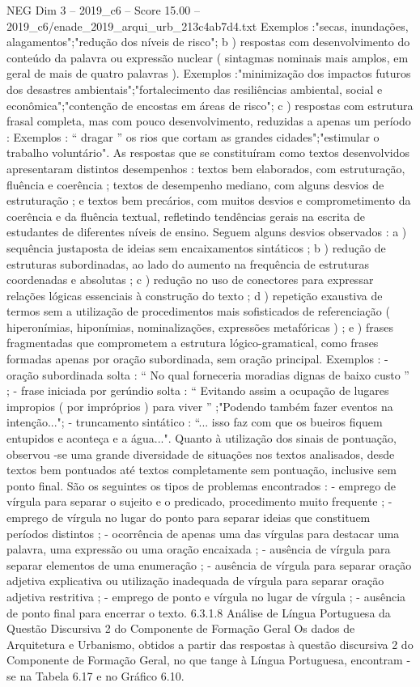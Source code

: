\begin{textsample}{NEG Dim 3 – 2019\_c6 – Score 15.00 – 2019\_c6/enade\_2019\_arqui\_urb\_213c4ab7d4.txt}
Exemplos :"secas, inundações, alagamentos";"redução dos níveis de risco"; b ) respostas com desenvolvimento do conteúdo da palavra ou expressão nuclear ( sintagmas nominais mais amplos, em geral de mais de quatro palavras ).
Exemplos :"minimização dos impactos futuros dos desastres ambientais";"fortalecimento das resiliências ambiental, social e econômica";"contenção de encostas em áreas de risco"; c ) respostas com estrutura frasal completa, mas com pouco desenvolvimento, reduzidas a apenas um período : Exemplos : “ dragar ” os rios que cortam as grandes cidades";"estimular o trabalho voluntário".
As respostas que se constituíram como textos desenvolvidos apresentaram distintos desempenhos : textos bem elaborados, com estruturação, fluência e coerência ; textos de desempenho mediano, com alguns desvios de estruturação ; e textos bem precários, com muitos desvios e comprometimento da coerência e da fluência textual, refletindo tendências gerais na escrita de estudantes de diferentes níveis de ensino.
Seguem alguns desvios observados : a ) sequência justaposta de ideias sem encaixamentos sintáticos ; b ) redução de estruturas subordinadas, ao lado do aumento na frequência de estruturas coordenadas e absolutas ; c ) redução no uso de conectores para expressar relações lógicas essenciais à construção do texto ; d ) repetição exaustiva de termos sem a utilização de procedimentos mais sofisticados de referenciação ( hiperonímias, hiponímias, nominalizações, expressões metafóricas ) ; e ) frases fragmentadas que comprometem a estrutura lógico-gramatical, como frases formadas apenas por oração subordinada, sem oração principal.
Exemplos : - oração subordinada solta : “ No qual forneceria moradias dignas de baixo custo ” ; - frase iniciada por gerúndio solta : “ Evitando assim a ocupação de lugares impropios ( por impróprios ) para viver ” ;"Podendo também fazer eventos na intenção..."; - truncamento sintático : “... isso faz com que os bueiros fiquem entupidos e aconteça e a água...".
Quanto à utilização dos sinais de pontuação, observou -se uma grande diversidade de situações nos textos analisados, desde textos bem pontuados até textos completamente sem pontuação, inclusive sem ponto final.
São os seguintes os tipos de problemas encontrados : - emprego de vírgula para separar o sujeito e o predicado, procedimento muito frequente ; - emprego de vírgula no lugar do ponto para separar ideias que constituem períodos distintos ; - ocorrência de apenas uma das vírgulas para destacar uma palavra, uma expressão ou uma oração encaixada ; - ausência de vírgula para separar elementos de uma enumeração ; - ausência de vírgula para separar oração adjetiva explicativa ou utilização inadequada de vírgula para separar oração adjetiva restritiva ; - emprego de ponto e vírgula no lugar de vírgula ; - ausência de ponto final para encerrar o texto. 6.3.1.8 Análise de Língua Portuguesa da Questão Discursiva 2 do Componente de Formação Geral Os dados de Arquitetura e Urbanismo, obtidos a partir das respostas à questão discursiva 2 do Componente de Formação Geral, no que tange à Língua Portuguesa, encontram -se na Tabela 6.17 e no Gráfico 6.10.

\end{textsample}
